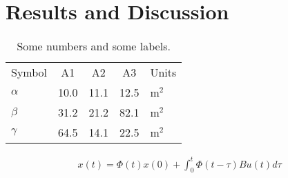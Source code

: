 \chapter{Results and Discussion} \label{sec: Results}

\lipsum[1-4]

\begin{table}[htb!] \centering
    \caption{Some numbers and some labels.}

    \begin{tabular}{l | c c c | l}
        Symbol   &   A1 &   A2 &   A3 & Units \\
        \doublehline
        $\alpha$ & 10.0 & 11.1 & 12.5 & m$^2$ \\ 
        $\beta$  & 31.2 & 21.2 & 82.1 & m$^2$ \\ 
        $\gamma$ & 64.5 & 14.1 & 22.5 & m$^2$
    \end{tabular}

    \label{tab: Table_1}
\end{table}

\lipsum[3-4]
\begin{align*}
    x(t) = \Phi(t)x(0) + \int_{0}^{t} \Phi(t-\tau) B u(t) d\tau
\end{align*}

\lipsum[5-7]